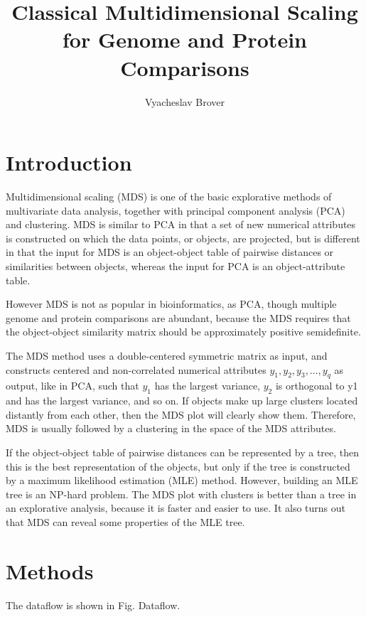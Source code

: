 \documentclass[10pt,a4paper]{article}
\title{Classical Multidimensional Scaling for Genome and Protein Comparisons}
\author{Vyacheslav Brover}
\begin{document}
\maketitle

\tableofcontents


\section{Introduction}

Multidimensional scaling (MDS) is one of the basic explorative methods of multivariate data analysis, together with principal component analysis (PCA) and clustering. 
MDS is similar to PCA in that a set of new numerical attributes is constructed on which the data points, or objects, are projected, 
but is different in that the input for MDS is an object-object table of pairwise distances or similarities between objects, 
whereas the input for PCA is an object-attribute table. 

However MDS is not as popular in bioinformatics, as PCA, though multiple genome and protein comparisons are abundant,
because the MDS requires that the object-object similarity matrix should be approximately positive semidefinite.

The MDS method uses a double-centered symmetric matrix as input, and constructs centered and non-correlated numerical attributes $y_1, y_2, y_3, \dots, y_q$ as output, 
like in PCA, such that $y_1$ has the largest variance, $y_2$ is orthogonal to y1 and has the largest variance, and so on. 
If objects make up large clusters located distantly from each other, then the MDS plot will clearly show them. 
Therefore, MDS is usually followed by a clustering in the space of the MDS attributes. 

If the object-object table of pairwise distances can be represented by a tree, then this is the best representation of the objects, 
but only if the tree is constructed by a maximum likelihood estimation (MLE) method. 
However, building an MLE tree is an NP-hard problem. 
The MDS plot with clusters is better than a tree in an explorative analysis, because it is faster and easier to use. 
It also turns out that MDS can reveal some properties of the MLE tree.




\section{Methods}
    
The dataflow is shown in Fig. {Dataflow}.
\end{document}
